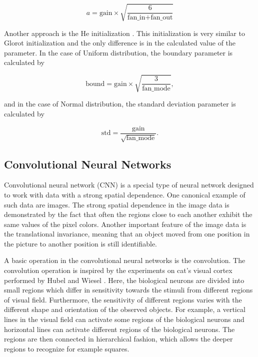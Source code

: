 \begin{equation}
    a = \text{gain} \times \sqrt{\frac{6}{\text{fan\_in} + \text{fan\_out}}}
\end{equation}

Another approach is the He initialization \cite{he2015delving}.
This initialization is very similar to Glorot initialization and the only difference is in the calculated value of the parameter.
In the case of Uniform distribution, the boundary parameter is calculated by

\begin{equation}
    \text{bound} = \text{gain} \times \sqrt{\frac{3}{\text{fan\_mode}}},
\end{equation}

and in the case of Normal distribution, the standard deviation parameter is calculated by

\begin{equation}
    \text{std} = \frac{\text{gain}}{\sqrt{\text{fan\_mode}}}.
\end{equation}

\subsection{Convolutional Neural Networks}
Convolutional neural network (CNN) is a special type of neural network designed to work with data with a strong spatial dependence.
One canonical example of such data are images.
The strong spatial dependence in the image data is demonstrated by the fact that often the regions close to each another exhibit the same values of the pixel colors.
Another important feature of the image data is the translational invariance, meaning that an object moved from one position in the picture to another position is still identifiable.

A basic operation in the convolutional neural networks is the convolution.
The convolution operation is inspired by the experiments on cat's visual cortex performed by Hubel and Wiesel \cite{hubel1959receptive}.
Here, the biological neurons are divided into small regions which differ in sensitivity towards the stimuli from different regions of visual field.
Furthermore, the sensitivity of different regions varies with the different shape and orientation of the observed objects.
For example, a vertical lines in the visual field can activate some regions of the biological neurons and horizontal lines can activate different regions of the biological neurons.
The regions are then connected in hierarchical fashion, which allows the deeper regions to recognize for example squares.

